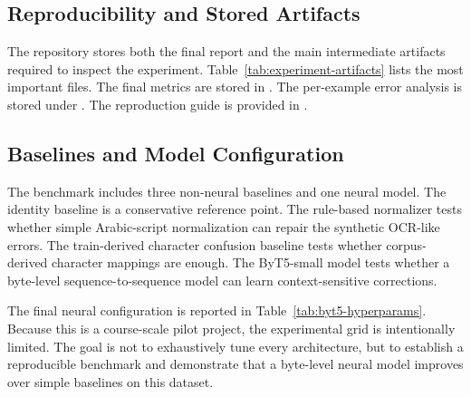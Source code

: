 \documentclass{article}
\begin{document}
\begin{table}[tbh!]
\begin{center}
\small

\caption{Experimental protocol used in the benchmark.}
\label{tab:evaluation-protocol}
\end{center}
\end{table}

\subsection{Reproducibility and Stored Artifacts}

The repository stores both the final report and the main intermediate artifacts required to inspect the experiment. Table~\ref{tab:experiment-artifacts} lists the most important files. The final metrics are stored in . The per-example error analysis is stored under . The reproduction guide is provided in .

\begin{table}[tbh!]
\begin{center}
\small

\caption{Important reproducibility artifacts in the repository.}
\label{tab:experiment-artifacts}
\end{center}
\end{table}

\subsection{Baselines and Model Configuration}

The benchmark includes three non-neural baselines and one neural model. The identity baseline is a conservative reference point. The rule-based normalizer tests whether simple Arabic-script normalization can repair the synthetic OCR-like errors. The train-derived character confusion baseline tests whether corpus-derived character mappings are enough. The ByT5-small model tests whether a byte-level sequence-to-sequence model can learn context-sensitive corrections.

The final neural configuration is reported in Table~\ref{tab:byt5-hyperparams}. Because this is a course-scale pilot project, the experimental grid is intentionally limited. The goal is not to exhaustively tune every architecture, but to establish a reproducible benchmark and demonstrate that a byte-level neural model improves over simple baselines on this dataset.
\end{document}
